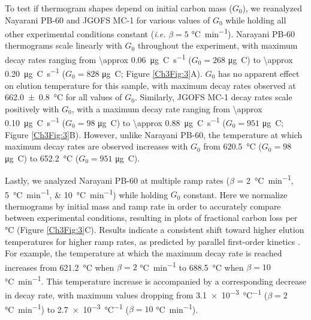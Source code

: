 To test if thermogram shapes depend on initial carbon mass ($G_0$), we reanalyzed Nayarani PB-60 and JGOFS MC-1 for various values of $G_0$ while holding all other experimental conditions constant (\textit{i.e.} $\beta = 5$ \si{\celsius.min^{-1}}). Narayani PB-60 thermograms scale linearly with $G_0$ throughout the experiment, with maximum decay rates ranging from \SI{\approx 0.06}{\micro g.C.s^{-1}} ($G_0 = 268$ \si{\micro g.C}) to \SI{\approx 0.20}{\micro g.C.s^{-1}} ($G_0 = 828$ \si{\micro g.C}; Figure \ref{Ch3Fig:3}A). $G_0$ has no apparent effect on elution temperature for this sample, with maximum decay rates observed at \SI{662.0 \pm 0.8}{\celsius} for all values of $G_0$. Similarly, JGOFS MC-1 decay rates scale positively with $G_0$, with a maximum decay rate ranging from \SI{\approx 0.10}{\micro g.C.s^{-1}} ($G_0 = 98$ \si{\micro g.C}) to \SI{\approx 0.88}{\micro g.C.s^{-1}} ($G_0 = 951$ \si{\micro g.C}; Figure \ref{Ch3Fig:3}B). However, unlike Narayani PB-60, the temperature at which maximum decay rates are observed increases with $G_0$ from \SI{620.5}{\celsius} ($G_0 = 98$ \si{\micro g.C}) to \SI{652.2}{\celsius} ($G_0 = 951$ \si{\micro g.C}).

Lastly, we analyzed Narayani PB-60 at multiple ramp rates ($\beta$ = \SIlist{2;5;10}{\celsius.min^{-1}}) while holding $G_0$ constant. Here we normalize thermograms by initial mass and ramp rate in order to accurately compare between experimental conditions, resulting in plots of fractional carbon loss per \si{\celsius} (Figure \ref{Ch3Fig:3}C). Results indicate a consistent shift toward higher elution temperatures for higher ramp rates, as predicted by parallel first-order kinetics \citep{Braun:1987vf,Miura:1995uo,Miura:1998jf}. For example, the temperature at which the maximum decay rate is reached increases from \SI{621.2}{\celsius} when $\beta = 2$ \si{\celsius.min^{-1}} to \SI{688.5}{\celsius} when $\beta = 10$ \si{\celsius.min^{-1}}. This temperature increase is accompanied by a corresponding decrease in decay rate, with maximum values dropping from \SI{3.1e-3}{\celsius^{-1}} ($\beta = 2$ \si{\celsius.min^{-1}}) to \SI{2.7e-3}{\celsius^{-1}} ($\beta = 10$ \si{\celsius.min^{-1}}).

